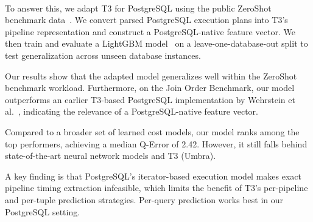 \paragraph{}
To answer this, we adapt T3 for PostgreSQL using the public ZeroShot benchmark data~\parencite{zeroshot}.
We convert parsed PostgreSQL execution plans into T3's pipeline representation and construct a PostgreSQL-native feature vector.
We then train and evaluate a LightGBM model~\parencite{lightgbm} on a leave-one-database-out split to test generalization across unseen database instances.

Our results show that the adapted model generalizes well within the ZeroShot benchmark workload.
Furthermore, on the Join Order Benchmark, our model outperforms an earlier T3-based PostgreSQL implementation by Wehrstein et al.~\parencite{jobcomplex}, indicating the relevance of a PostgreSQL-native feature vector.

Compared to a broader set of learned cost models, our model ranks among the top performers, achieving a median Q-Error of 2.42.
However, it still falls behind state-of-the-art neural network models and T3 (Umbra).

A key finding is that PostgreSQL's iterator-based execution model makes exact pipeline timing extraction infeasible, which limits the benefit of T3's per-pipeline and per-tuple prediction strategies.
Per-query prediction works best in our PostgreSQL setting.


